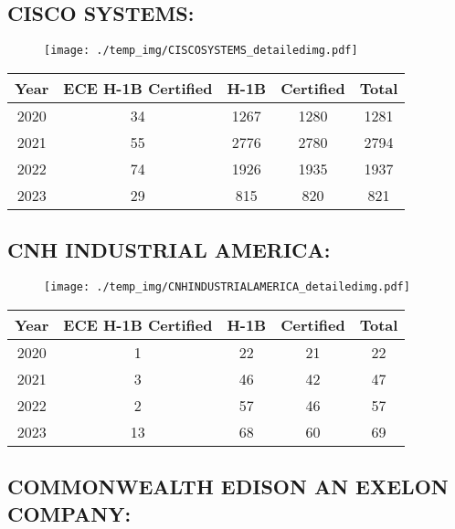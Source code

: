 \documentclass{article}%
\begin{document}
%
\newpage%
\subsection{CISCO SYSTEMS:}%
\label{subsec:CISCOSYSTEMS}%
\label{CISCOSYSTEMSdetailed}%


\begin{figure}[htbp]%
\centering%
\texttt{[image: ./temp\_img/CISCOSYSTEMS\_detailedimg.pdf]}%
\end{figure}

%
\begin{longtable}{c|c|c|c|c}%
\hline%
Year&ECE H{-}1B Certified&H{-}1B&Certified&Total\\%
\hline%
2020&34&1267&1280&1281\\%
\hline%
2021&55&2776&2780&2794\\%
\hline%
2022&74&1926&1935&1937\\%
\hline%
2023&29&815&820&821\\%
\hline%
\end{longtable}

%
\newpage%
\subsection{CNH INDUSTRIAL AMERICA:}%
\label{subsec:CNHINDUSTRIALAMERICA}%
\label{CNHINDUSTRIALAMERICAdetailed}%


\begin{figure}[htbp]%
\centering%
\texttt{[image: ./temp\_img/CNHINDUSTRIALAMERICA\_detailedimg.pdf]}%
\end{figure}

%
\begin{longtable}{c|c|c|c|c}%
\hline%
Year&ECE H{-}1B Certified&H{-}1B&Certified&Total\\%
\hline%
2020&1&22&21&22\\%
\hline%
2021&3&46&42&47\\%
\hline%
2022&2&57&46&57\\%
\hline%
2023&13&68&60&69\\%
\hline%
\end{longtable}

%
\newpage%
\subsection{COMMONWEALTH EDISON AN EXELON COMPANY:}%
\label{subsec:COMMONWEALTHEDISONANEXELONCOMPANY}%
\label{COMMONWEALTHEDISONANEXELONCOMPANYdetailed}%
\end{document}
